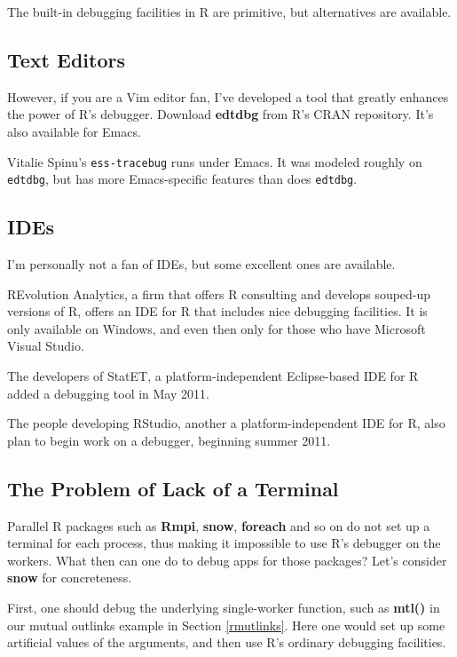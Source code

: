 The built-in debugging facilities in R are primitive, but alternatives
are available.

\subsection{Text Editors}  

However, if you are a Vim editor fan, I've developed a tool that greatly
enhances the power of R's debugger.  Download {\bf edtdbg} from R's CRAN
repository.  It's also available for Emacs.

Vitalie Spinu's {\tt ess-tracebug} runs under Emacs.  It was modeled
roughly on {\tt edtdbg}, but has more Emacs-specific features
than does {\tt edtdbg}.

\subsection{IDEs}

I'm personally not a fan of IDEs, but some excellent ones are available.

REvolution Analytics, a firm that offers R consulting and develops
souped-up versions of R, offers an IDE for R that includes nice
debugging facilities.  It is only available on Windows, and even then
only for those who have Microsoft Visual Studio.

The developers of StatET, a platform-independent Eclipse-based IDE for
R added a debugging tool in May 2011.

The people developing RStudio, another  a platform-independent IDE for
R, also plan to begin work on a debugger, beginning summer 2011.

\subsection{The Problem of Lack of a Terminal}

Parallel R packages such as {\bf Rmpi}, {\bf snow}, {\bf foreach} and so
on do not set up a terminal for each process, thus making it impossible
to use R's debugger on the workers.  What then can one do to debug apps
for those packages?  Let's consider {\bf snow} for concreteness.

First, one should debug the underlying single-worker function, such as {\bf
mtl()} in our mutual outlinks example in Section \ref{rmutlinks}.  Here
one would set up some artificial values of the arguments, and then use
R's ordinary debugging facilities.

